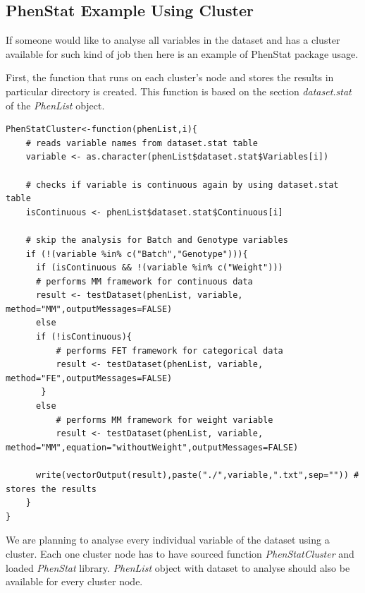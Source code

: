 \documentclass[12pt,a4paper]{article}
\begin{document}
\subsection{PhenStat Example Using Cluster}
If someone would like to analyse all variables in the dataset and has a cluster available for such kind of job then here is an example of PhenStat package usage.

First, the function that runs on each cluster's node and stores the results in particular directory is created. This function is based on the section \textit{dataset.stat} of the \textit{PhenList} object. 


\begingroup
\fontsize{8pt}{12pt}\selectfont
\begin{verbatim}
PhenStatCluster<-function(phenList,i){
    # reads variable names from dataset.stat table
    variable <- as.character(phenList$dataset.stat$Variables[i]) 
    
    # checks if variable is continuous again by using dataset.stat table
    isContinuous <- phenList$dataset.stat$Continuous[i]	
    
    # skip the analysis for Batch and Genotype variables
    if (!(variable %in% c("Batch","Genotype"))){	
      if (isContinuous && !(variable %in% c("Weight"))) 
	  # performs MM framework for continuous data
	  result <- testDataset(phenList, variable, method="MM",outputMessages=FALSE)	 
      else
	  if (!isContinuous){
	      # performs FET framework for categorical data
	      result <- testDataset(phenList, variable, method="FE",outputMessages=FALSE)	
	   }
	  else
	      # performs MM framework for weight variable
	      result <- testDataset(phenList, variable, method="MM",equation="withoutWeight",outputMessages=FALSE) 
	      
      write(vectorOutput(result),paste("./",variable,".txt",sep="")) # stores the results
    }
}
\end{verbatim}
\endgroup

We are planning to analyse every individual variable of the dataset using a cluster. Each one cluster node has to have sourced function \textit{PhenStatCluster} and loaded \textit{PhenStat} library. 
\textit{PhenList} object with dataset to analyse should also be available for every cluster node.
\end{document}
